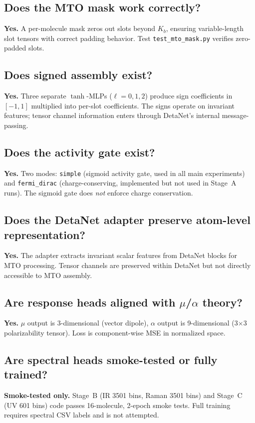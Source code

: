 \documentclass[11pt,a4paper]{article}
\begin{document}
\subsection{Does the MTO mask work correctly?}
\textbf{Yes.} A per-molecule mask zeros out slots beyond $K_b$, ensuring variable-length slot tensors with correct padding behavior. Test \texttt{test\_mto\_mask.py} verifies zero-padded slots.

\subsection{Does signed assembly exist?}
\textbf{Yes.} Three separate $\tanh$-MLPs ($\ell=0,1,2$) produce sign coefficients in $[-1,1]$ multiplied into per-slot coefficients. The signs operate on invariant features; tensor channel information enters through DetaNet's internal message-passing.

\subsection{Does the activity gate exist?}
\textbf{Yes.} Two modes: \texttt{simple} (sigmoid activity gate, used in all main experiments) and \texttt{fermi\_dirac} (charge-conserving, implemented but not used in Stage~A runs). The sigmoid gate does \textit{not} enforce charge conservation.

\subsection{Does the DetaNet adapter preserve atom-level representation?}
\textbf{Yes.} The adapter extracts invariant scalar features from DetaNet blocks for MTO processing. Tensor channels are preserved within DetaNet but not directly accessible to MTO assembly.

\subsection{Are response heads aligned with $\mu$/$\alpha$ theory?}
\textbf{Yes.} $\mu$ output is 3-dimensional (vector dipole), $\alpha$ output is 9-dimensional (3$\times$3 polarizability tensor). Loss is component-wise MSE in normalized space.

\subsection{Are spectral heads smoke-tested or fully trained?}
\textbf{Smoke-tested only.} Stage~B (IR 3501 bins, Raman 3501 bins) and Stage~C (UV 601 bins) code passes 16-molecule, 2-epoch smoke tests. Full training requires spectral CSV labels and is not attempted.
\end{document}
